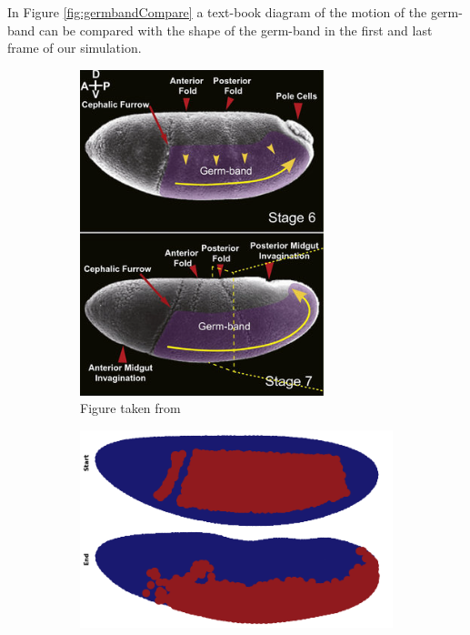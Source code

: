 In Figure \ref{fig:germbandCompare} a text-book diagram of the motion of the germ-band can be compared with the shape of the germ-band in the first and last frame of our simulation. 
\begin{figure}[H]
    \centering
    \begin{subfigure}[b]{0.3\textwidth}
        \includegraphics[width=\textwidth]{chapters/Results/figures/compareGB.png}
    \caption{Figure taken from  }
    \end{subfigure}
    \begin{subfigure}[b]{0.61\textwidth}
    \includegraphics[width=\textwidth]{chapters/Results/figures/gb_firstframe_lastframe.png}

\end{subfigure}
\end{figure}
